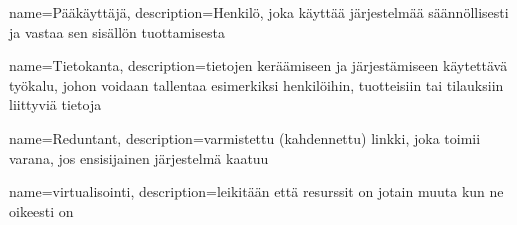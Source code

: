     {
    name={Pääkäyttäjä},
    description={Henkilö, joka käyttää järjestelmää säännöllisesti ja vastaa sen sisällön tuottamisesta}
    }

    {
    name={Tietokanta},
    description={tietojen keräämiseen ja järjestämiseen käytettävä työkalu, johon voidaan tallentaa esimerkiksi henkilöihin, tuotteisiin tai tilauksiin liittyviä tietoja}
    }

    {
    name={Reduntant},
    description={varmistettu (kahdennettu) linkki, joka toimii varana, jos ensisijainen järjestelmä kaatuu}
    }

    {
    name={virtualisointi},
    description={leikitään että resurssit on jotain muuta kun ne oikeesti on}
    }


